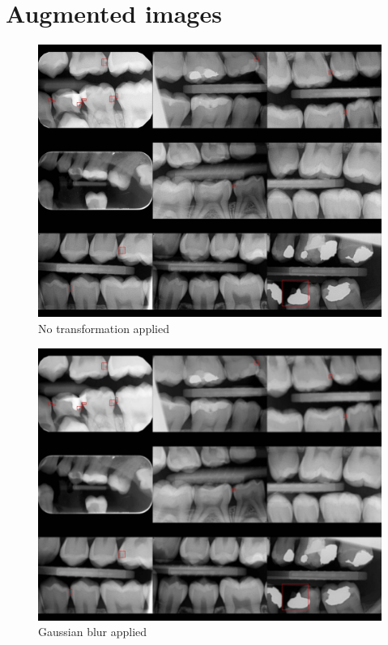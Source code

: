 \chapter{Augmented images}
\label{appendix:img_transformations}
\begin{figure}
    \includegraphics[width =0.9\linewidth]{images/no_trasnforms.jpg}
    \caption{No transformation applied}
\end{figure}
\begin{figure}
    \includegraphics[width =0.9\linewidth]{images/gaussian_blur.jpg}
    \caption{Gaussian blur applied}
\end{figure}

